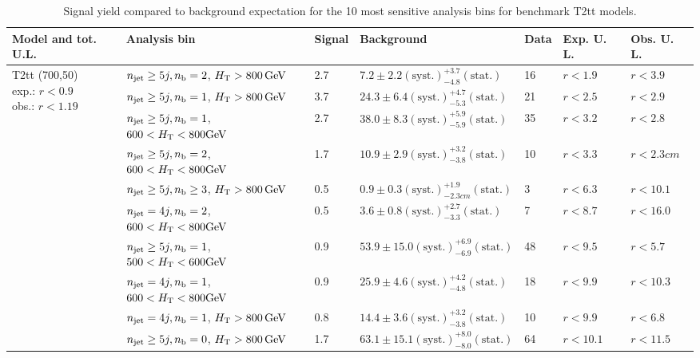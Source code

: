 \begin{table}[h!] 
  \scriptsize
  \caption{ 
Signal yield compared to background expectation for the 10 most sensitive analysis bins 
for benchmark T2tt models.
  \label{tab:sigBenchmarksYields_T2tt}}
  \centering 
  \begin{tabular}{ lllllll } 
    \hline 
    \hline 
    Model and tot. U.L. & Analysis bin & Signal & Background & Data & Exp. U. L. & Obs. U. L. \\ \hline
\multirow{10}{*}{\parbox[t]{2.3cm}{T2tt (700,50)\\exp.: $r<0.9$\\obs.: $r<1.19$}}
 & $n_{\mathrm{jet}} \geq5j,n_{\text{b}} =2$, $\mbox{$H_\text{T}$} > 800 \, \mathrm{GeV}$ & 2.7 & $7.2 \pm 2.2 \mathrm{(syst.)} ^{+3.7}_{-4.8} \mathrm{(stat.)}$ & 16 & $r < 1.9$ & $r < 3.9$\\ 
 & $n_{\mathrm{jet}} \geq5j,n_{\text{b}} =1$, $\mbox{$H_\text{T}$} > 800 \, \mathrm{GeV}$ & 3.7 & $24.3 \pm 6.4 \mathrm{(syst.)} ^{+4.7}_{-5.3} \mathrm{(stat.)}$ & 21 & $r < 2.5$ & $r < 2.9$\\ 
 & $n_{\mathrm{jet}} \geq5j,n_{\text{b}} =1$, $600 < \mbox{$H_\text{T}$} < 800 \mathrm{GeV}$ & 2.7 & $38.0 \pm 8.3 \mathrm{(syst.)} ^{+5.9}_{-5.9} \mathrm{(stat.)}$ & 35 & $r < 3.2$ & $r < 2.8$\\ 
 & $n_{\mathrm{jet}} \geq5j,n_{\text{b}} =2$, $600 < \mbox{$H_\text{T}$} < 800 \mathrm{GeV}$ & 1.7 & $10.9 \pm 2.9 \mathrm{(syst.)} ^{+3.2}_{-3.8} \mathrm{(stat.)}$ & 10 & $r < 3.3$ & $r < 2.3cm$\\ 
 & $n_{\mathrm{jet}} \geq5j,n_{\text{b}} \geq3$, $\mbox{$H_\text{T}$} > 800 \, \mathrm{GeV}$ & 0.5 & $0.9 \pm 0.3 \mathrm{(syst.)} ^{+1.9}_{-2.3cm} \mathrm{(stat.)}$ & 3 & $r < 6.3$ & $r < 10.1$\\ 
 & $n_{\mathrm{jet}} =4j,n_{\text{b}} =2$, $600 < \mbox{$H_\text{T}$} < 800 \mathrm{GeV}$ & 0.5 & $3.6 \pm 0.8 \mathrm{(syst.)} ^{+2.7}_{-3.3} \mathrm{(stat.)}$ & 7 & $r < 8.7$ & $r < 16.0$\\ 
 & $n_{\mathrm{jet}} \geq5j,n_{\text{b}} =1$, $500 < \mbox{$H_\text{T}$} < 600 \mathrm{GeV}$ & 0.9 & $53.9 \pm 15.0 \mathrm{(syst.)} ^{+6.9}_{-6.9} \mathrm{(stat.)}$ & 48 & $r < 9.5$ & $r < 5.7$\\ 
 & $n_{\mathrm{jet}} =4j,n_{\text{b}} =1$, $600 < \mbox{$H_\text{T}$} < 800 \mathrm{GeV}$ & 0.9 & $25.9 \pm 4.6 \mathrm{(syst.)} ^{+4.2}_{-4.8} \mathrm{(stat.)}$ & 18 & $r < 9.9$ & $r < 10.3$\\ 
 & $n_{\mathrm{jet}} =4j,n_{\text{b}} =1$, $\mbox{$H_\text{T}$} > 800 \, \mathrm{GeV}$ & 0.8 & $14.4 \pm 3.6 \mathrm{(syst.)} ^{+3.2}_{-3.8} \mathrm{(stat.)}$ & 10 & $r < 9.9$ & $r < 6.8$\\ 
 & $n_{\mathrm{jet}} \geq5j,n_{\text{b}} =0$, $\mbox{$H_\text{T}$} > 800 \, \mathrm{GeV}$ & 1.7 & $63.1 \pm 15.1 \mathrm{(syst.)} ^{+8.0}_{-8.0} \mathrm{(stat.)}$ & 64 & $r < 10.1$ & $r < 11.5$\\ \hline

\end{tabular}
\end{table}
